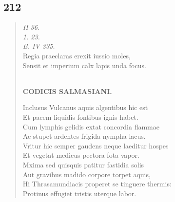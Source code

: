 \documentclass[11pt, a4paper]{report}
\begin{document}
            \subsection*{212}
      \begin{verse}
      \textit{II 36.} \\ \textit{1. 23.} \\ \textit{B. IV 335.} \\ Regia praeclaras erexit iussio moles, \\ Sensit et imperium calx lapis unda focus. \\ 
        ﻿\pagebreak 
    \begin{center} \textbf{CODICIS SALMASIANI.} \end{center} \marginpar{[181]} Inclusus Vulcanus aquis algentibus hic est \\ Et pacem liquidis fontibus ignis habet. \\ Cum lymphis gelidis extat concordia flammae \\ Ac stupet ardentes frigida nympha lacus. \\ Vritur hic semper gaudens neque laeditur hospes \\ Et vegetat medicus pectora fota vapor. \\ Mxima sed quisquis patitur fastidia solis \\ Aut gravibus madido corpore torpet aquis, \\ Hi Thrasamundiacis properet se tinguere thermis: \\ Protinus effugiet tristis uterque labor. \\ 
      \end{verse}
  
\end{document}
